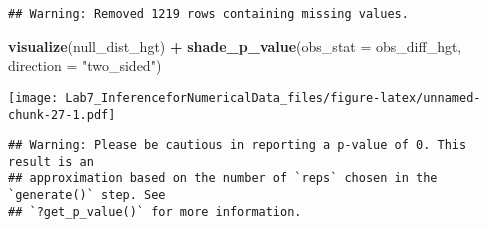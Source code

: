 \documentclass[
]{article}
\newenvironment{Shaded}{\begin{snugshade}}{\end{snugshade}}
\newcommand{\DataTypeTok}[1]{\textcolor[rgb]{0.13,0.29,0.53}{#1}}
\newcommand{\DecValTok}[1]{\textcolor[rgb]{0.00,0.00,0.81}{#1}}
\newcommand{\KeywordTok}[1]{\textcolor[rgb]{0.13,0.29,0.53}{\textbf{#1}}}
\newcommand{\NormalTok}[1]{#1}
\newcommand{\OperatorTok}[1]{\textcolor[rgb]{0.81,0.36,0.00}{\textbf{#1}}}
\newcommand{\StringTok}[1]{\textcolor[rgb]{0.31,0.60,0.02}{#1}}
\begin{document}
\begin{Shaded}
\end{Shaded}

\begin{verbatim}
## Warning: Removed 1219 rows containing missing values.
\end{verbatim}

\begin{Shaded}
\begin{Highlighting}[]
\KeywordTok{visualize}\NormalTok{(null_dist_hgt) }\OperatorTok{+}\StringTok{ }
\StringTok{  }\KeywordTok{shade_p_value}\NormalTok{(}\DataTypeTok{obs_stat =}\NormalTok{ obs_diff_hgt, }\DataTypeTok{direction =} \StringTok{"two_sided"}\NormalTok{)}
\end{Highlighting}
\end{Shaded}

\texttt{[image: Lab7\_InferenceforNumericalData\_files/figure-latex/unnamed-chunk-27-1.pdf]}

\begin{Shaded}
\end{Shaded}

\begin{verbatim}
## Warning: Please be cautious in reporting a p-value of 0. This result is an
## approximation based on the number of `reps` chosen in the `generate()` step. See
## `?get_p_value()` for more information.
\end{verbatim}
\end{document}
